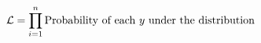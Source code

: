 \documentclass[preview]{standalone}
\begin{document}
\begin{align*}
\special{dvisvgm:raw <g id='unique000'>}\mathcal{L}=\prod^n_{i=1}\text{Probability of each }y\text{ under the distribution}\special{dvisvgm:raw </g>}
\end{align*}
\end{document}

